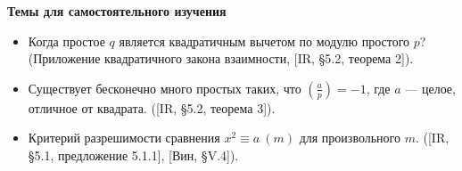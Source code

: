 \noindent\textbf{Темы для самостоятельного изучения}
\begin{itemize}[topsep=0pt]
    \item Когда простое $q$ является квадратичным вычетом по модулю простого $p$? (Приложение квадратичного закона взаимности, [IR, \S 5.2, теорема 2]).
    \item Существует бесконечно много простых таких, что $\left(\frac{a}{p}\right)=-1$, где $a$ --- целое, отличное от квадрата. ([IR, \S 5.2, теорема 3]).
    \item Критерий разрешимости сравнения $x^2\equiv a\ (m)$ для произвольного $m$. ([IR, \S 5.1, предложение 5.1.1], [Вин, \S V.4]).
\end{itemize}
